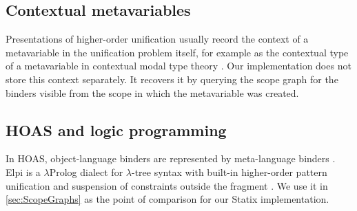\subsection{Contextual metavariables}
Presentations of higher-order unification usually record the context of a
metavariable in the unification problem itself, for example as the contextual
type of a metavariable in contextual modal type theory
\autocite{nanevski2008contextual}. Our implementation does not store this
context separately. It recovers it by querying the scope graph for the binders
visible from the scope in which the metavariable was created.

\subsection{HOAS and logic programming}
In HOAS, object-language binders are represented by meta-language binders
\autocite{pfenning_higher-order_nodate}. Elpi is a $\lambda$Prolog dialect for
$\lambda$-tree syntax with built-in higher-order pattern unification and
suspension of constraints outside the fragment \autocite{dunchev_elpi_2015}. We
use it in \cref{sec:ScopeGraphs} as the point of comparison for our Statix
implementation.

